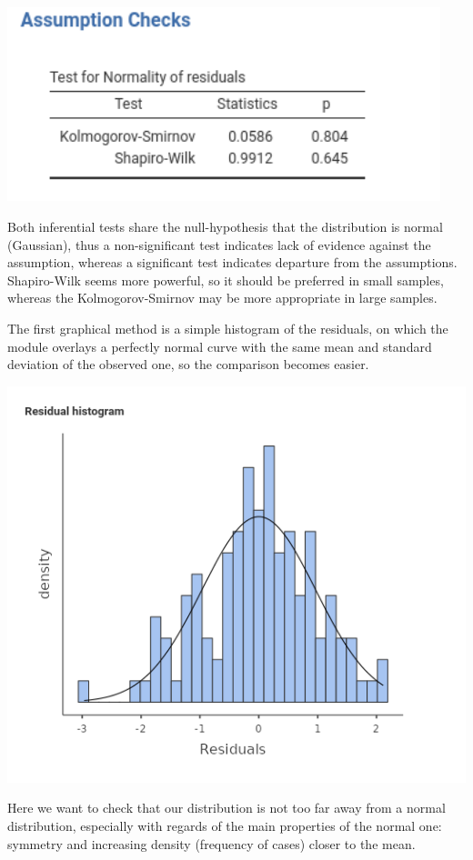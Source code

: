\documentclass[
]{book}
\begin{document}
\includegraphics[width=4.96in]{bookletpics/2_assumptions_output3}

Both inferential tests share the null-hypothesis that the distribution is normal (Gaussian), thus a non-significant test indicates lack of evidence against the assumption, whereas a significant test indicates departure from the assumptions. Shapiro-Wilk seems more powerful, so it should be preferred in small samples, whereas the Kolmogorov-Smirnov may be more appropriate in large samples.

The first graphical method is a simple histogram of the residuals, on which the module overlays a perfectly normal curve with the same mean and standard deviation of the observed one, so the comparison becomes easier.

\includegraphics[width=7.32in]{bookletpics/2_assumptions_output4}

Here we want to check that our distribution is not too far away from a normal distribution, especially with regards of the main properties of the normal one: symmetry and increasing density (frequency of cases) closer to the mean.
\end{document}
